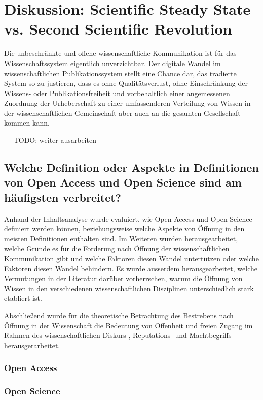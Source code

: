 \chapter{Diskussion: Scientific Steady State vs. Second Scientific Revolution}

Die unbeschränkte und offene wissenschaftliche Kommunikation ist für das Wissenschaftssystem eigentlich unverzichtbar. Der digitale Wandel im wissenschaftlichen Publikationssystem stellt eine Chance dar, das tradierte System so zu justieren, dass es ohne Qualitätsverlust, ohne Einschränkung der Wissens- oder Publikationsfreiheit und vorbehaltlich einer angemessenen Zuordnung der Urheberschaft zu einer umfassenderen Verteilung von Wissen in der wissenschaftlichen Gemeinschaft aber auch an die gesamten Gesellschaft kommen kann.

--- TODO: weiter ausarbeiten ---

\section{Welche Definition oder Aspekte in Definitionen von Open Access und Open Science sind am häufigsten verbreitet?}

Anhand der Inhaltsanalyse wurde evaluiert, wie Open Access und Open Science definiert werden können, beziehungsweise welche Aspekte von Öffnung in den meisten Definitionen enthalten sind. Im Weiteren wurden herausgearbeitet, welche Gründe es für die Forderung nach Öffnung der wissenschaftlichen Kommunikation gibt und welche Faktoren diesen Wandel untertützen oder welche Faktoren diesen Wandel behindern. Es wurde ausserdem herausgearbeitet, welche Vermutungen in der Literatur darüber vorherrschen, warum die Öffnung von Wissen in den verschiedenen wissenschaftlichen Disziplinen unterschiedlich stark etabliert ist.

Abschließend wurde für die theoretische Betrachtung des Bestrebens nach Öffnung in der Wissenschaft die Bedeutung von Offenheit und freien Zugang im Rahmen des wissenschaftlichen Diskurs-, Reputations- und Machtbegriffs herausgerarbeitet.

\subsection{Open Access}

\subsection{Open Science}

